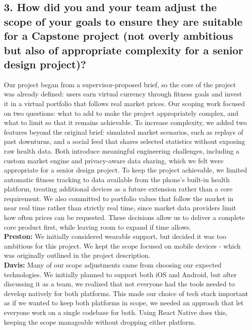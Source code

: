 \documentclass{article}
\begin{document}
\subsection*{3. How did you and your team adjust the scope of your goals to ensure they are suitable for a Capstone project (not overly ambitious but also of appropriate complexity for a senior design project)?}
Our project began from a supervisor-proposed brief, so the core of the project was already defined: users earn virtual currency through fitness goals and invest it in a virtual portfolio that follows real market prices. Our scoping work focused on two questions: what to add to make the project appropriately complex, and what to limit so that it remains achievable. To increase complexity, we added two features beyond the original brief: simulated market scenarios, such as replays of past downturns, and a social feed that shares selected statistics without exposing raw health data. Both introduce meaningful engineering challenges, including a custom market engine and privacy-aware data sharing, which we felt were appropriate for a senior design project. To keep the project achievable, we limited automatic fitness tracking to data available from the phone's built-in health platform, treating additional devices as a future extension rather than a core requirement. We also committed to portfolio values that follow the market in near real time rather than strictly real time, since market data providers limit how often prices can be requested. These decisions allow us to deliver a complete core product first, while leaving room to expand if time allows.
\newline \\
\textbf{Preston:} We initially considered wearable support, but decided it was too ambitious for this project. We kept the scope focused on mobile devices - which was originally outlined in the project description.  
\newline \\
\textbf{Davis:} Many of our scope adjustments came from choosing our expected technologies. We initially planned to support both iOS and Android, but after discussing it as a team, we realized that not everyone had the tools needed to develop natively for both platforms. This made our choice of tech stack important as if we wanted to keep both platforms in scope, we needed an approach that let everyone work on a single codebase for both. Using React Native does this, keeping the scope manageable without dropping either platform.
\end{document}
